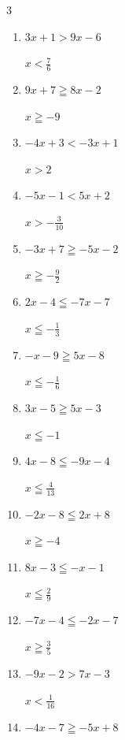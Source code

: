 \begin{multicols}{3}
\begin{enumerate}
        $\displaystyle x<\frac{10}{11}$

  \item $3x+1>9x-6$

        $\displaystyle x<\frac{7}{6}$

  \item $9x+7\geqq 8x-2$

        $\displaystyle x\geqq -9$

  \item $-4x+3<-3x+1$

        $\displaystyle x>2$

  \item $-5x-1<5x+2$

        $\displaystyle x>-\frac{3}{10}$

\columnbreak %

  \item $-3x+7\geqq -5x-2$

        $\displaystyle x\geqq -\frac{9}{2}$

  \item $2x-4\leqq -7x-7$

        $\displaystyle x\leqq -\frac{1}{3}$

  \item $-x-9\geqq 5x-8$

        $\displaystyle x\leqq -\frac{1}{6}$

  \item $3x-5\geqq 5x-3$

        $\displaystyle x\leqq -1$

  \item $4x-8\leqq -9x-4$

        $\displaystyle x\leqq \frac{4}{13}$

  \item $-2x-8\leqq 2x+8$

        $\displaystyle x\geqq -4$

  \item $8x-3\leqq -x-1$

        $\displaystyle x\leqq \frac{2}{9}$

  \item $-7x-4\leqq -2x-7$

        $\displaystyle x\geqq \frac{3}{5}$

  \item $-9x-2>7x-3$

        $\displaystyle x<\frac{1}{16}$

  \item $-4x-7\geqq -5x+8$


\end{enumerate}
\end{multicols}
